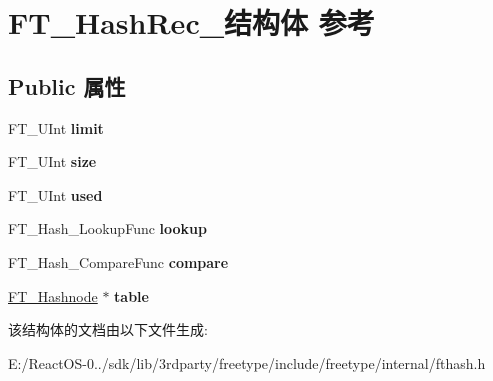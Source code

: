 \hypertarget{struct_f_t___hash_rec__}{}\section{F\+T\+\_\+\+Hash\+Rec\+\_\+结构体 参考}
\label{struct_f_t___hash_rec__}
\subsection*{Public 属性}
\begin{DoxyCompactItemize}
\item 
\mbox{\label{struct_f_t___hash_rec___a133b70ca4c8b06687c6d20d74a9ebdf5}} 
F\+T\+\_\+\+U\+Int {\bfseries limit}
\item 
\mbox{\label{struct_f_t___hash_rec___a140139e66723b6e4cc217ec1d308e2bd}} 
F\+T\+\_\+\+U\+Int {\bfseries size}
\item 
\mbox{\label{struct_f_t___hash_rec___a2b15ec750d02dc1656ceb31b7cc97278}} 
F\+T\+\_\+\+U\+Int {\bfseries used}
\item 
\mbox{\label{struct_f_t___hash_rec___a0a32c9de2408510282a1ef9e8b32dc14}} 
F\+T\+\_\+\+Hash\+\_\+\+Lookup\+Func {\bfseries lookup}
\item 
\mbox{\label{struct_f_t___hash_rec___ac2025e103498337d589823d10b6a96a9}} 
F\+T\+\_\+\+Hash\+\_\+\+Compare\+Func {\bfseries compare}
\item 
\mbox{\label{struct_f_t___hash_rec___a98916d46f7225af00dc93767ef8805f2}} 
\hyperlink{struct_f_t___hashnode_rec__}{F\+T\+\_\+\+Hashnode} $\ast$ {\bfseries table}
\end{DoxyCompactItemize}


该结构体的文档由以下文件生成\+:\begin{DoxyCompactItemize}
\item 
E\+:/\+React\+O\+S-\/0../sdk/lib/3rdparty/freetype/include/freetype/internal/fthash.\+h\end{DoxyCompactItemize}
